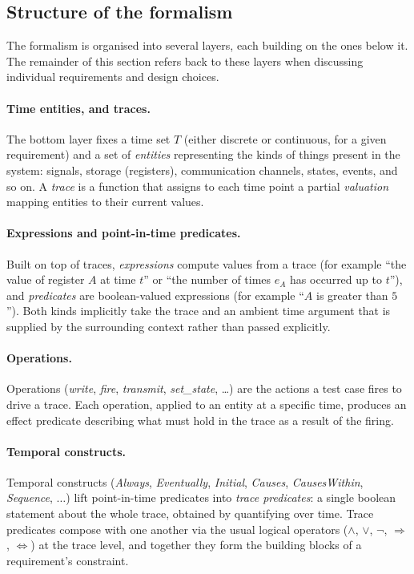 \subsection{Structure of the formalism}\label{subsec:structure}

The formalism is organised into several layers, each building on the ones below it. The remainder of this section refers back to these layers when discussing individual requirements and design choices.

\paragraph{Time entities, and traces.} The bottom layer fixes a time set $T$ (either discrete or continuous, for a given requirement) and a set of \emph{entities} representing the kinds of things present in the system: signals, storage (registers), communication channels, states, events, and so on. A \emph{trace} is a function that assigns to each time point a partial \emph{valuation} mapping entities to their current values.

\paragraph{Expressions and point-in-time predicates.} Built on top of traces, \emph{expressions} compute values from a trace (for example ``the value of register $A$ at time $t$'' or ``the number of times $e_A$ has occurred up to $t$''), and \emph{predicates} are boolean-valued expressions (for example ``$A$ is greater than $5$''). Both kinds implicitly take the trace and an ambient time argument that is supplied by the surrounding context rather than passed explicitly.

\paragraph{Operations.} Operations (\emph{write}, \emph{fire}, \emph{transmit}, \emph{set\_state}, \ldots) are the actions a test case fires to drive a trace. Each operation, applied to an entity at a specific time, produces an effect predicate describing what must hold in the trace as a result of the firing.

\paragraph{Temporal constructs.} Temporal constructs (\emph{Always}, \emph{Eventually}, \emph{Initial}, \emph{Causes}, \emph{CausesWithin}, \emph{Sequence}, $\ldots$) lift point-in-time predicates into \emph{trace predicates}: a single boolean statement about the whole trace, obtained by quantifying over time. Trace predicates compose with one another via the usual logical operators ($\land$, $\lor$, $\lnot$, $\Rightarrow$, $\Leftrightarrow$) at the trace level, and together they form the building blocks of a requirement's constraint.

